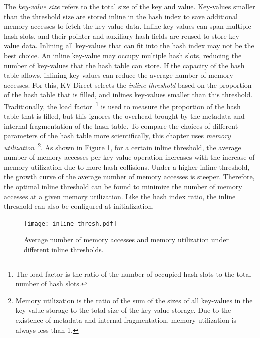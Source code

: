 The \textit{key-value size} refers to the total size of the key and value. Key-values smaller than the threshold size are stored inline in the hash index to save additional memory accesses to fetch the key-value data. Inline key-values can span multiple hash slots, and their pointer and auxiliary hash fields are reused to store key-value data. Inlining all key-values that can fit into the hash index may not be the best choice. An inline key-value may occupy multiple hash slots, reducing the number of key-values that the hash table can store. If the capacity of the hash table allows, inlining key-values can reduce the average number of memory accesses. For this, KV-Direct selects the \textit{inline threshold} based on the proportion of the hash table that is filled, and inlines key-values smaller than this threshold. Traditionally, the load factor~\footnote{The load factor is the ratio of the number of occupied hash slots to the total number of hash slots.} is used to measure the proportion of the hash table that is filled, but this ignores the overhead brought by the metadata and internal fragmentation of the hash table. To compare the choices of different parameters of the hash table more scientifically, this chapter uses \textit{memory utilization}~\footnote{Memory utilization is the ratio of the sum of the sizes of all key-values in the key-value storage to the total size of the key-value storage. Due to the existence of metadata and internal fragmentation, memory utilization is always less than 1.}. As shown in Figure \ref{kvdirect:fig:inline-offline}, for a certain inline threshold, the average number of memory accesses per key-value operation increases with the increase of memory utilization due to more hash collisions. Under a higher inline threshold, the growth curve of the average number of memory accesses is steeper. Therefore, the optimal inline threshold can be found to minimize the number of memory accesses at a given memory utilization. Like the hash index ratio, the inline threshold can also be configured at initialization.

\begin{figure}[htbp]
	\centering
	\texttt{[image: inline\_thresh.pdf]}
	\caption{Average number of memory accesses and memory utilization under different inline thresholds.}
	\label{kvdirect:fig:inline-offline}
\end{figure}

